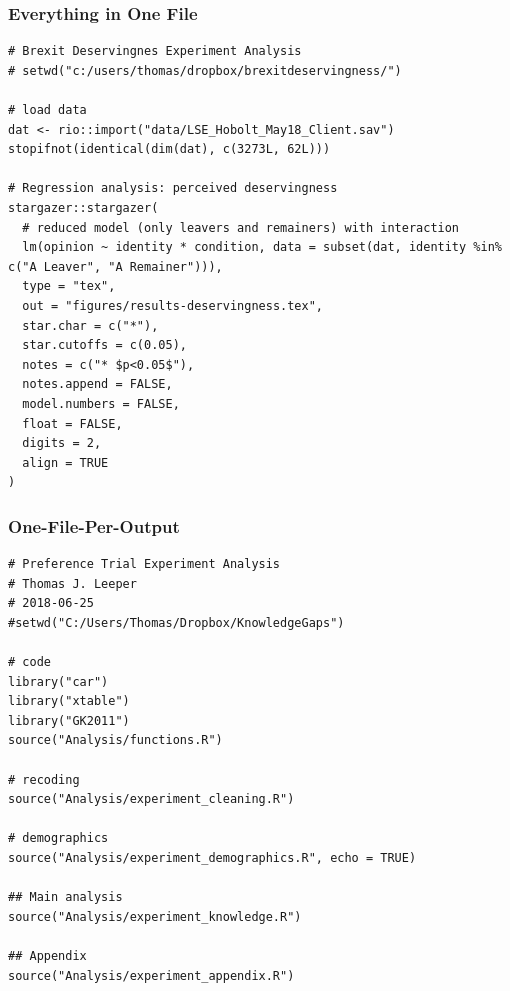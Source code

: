 \documentclass[14pt]{beamer}
\begin{document}




\begin{frame}[fragile]
\frametitle{Everything in One File}

\scriptsize

\begin{verbatim}
# Brexit Deservingnes Experiment Analysis
# setwd("c:/users/thomas/dropbox/brexitdeservingness/")

# load data
dat <- rio::import("data/LSE_Hobolt_May18_Client.sav")
stopifnot(identical(dim(dat), c(3273L, 62L)))

# Regression analysis: perceived deservingness
stargazer::stargazer(
  # reduced model (only leavers and remainers) with interaction
  lm(opinion ~ identity * condition, data = subset(dat, identity %in% c("A Leaver", "A Remainer"))),
  type = "tex",
  out = "figures/results-deservingness.tex",
  star.char = c("*"),
  star.cutoffs = c(0.05),
  notes = c("* $p<0.05$"),
  notes.append = FALSE,
  model.numbers = FALSE,
  float = FALSE,
  digits = 2,
  align = TRUE
)
\end{verbatim}
\end{frame}



\begin{frame}[fragile]
\frametitle{One-File-Per-Output}

\scriptsize

\begin{verbatim}
# Preference Trial Experiment Analysis
# Thomas J. Leeper
# 2018-06-25
#setwd("C:/Users/Thomas/Dropbox/KnowledgeGaps")

# code
library("car")
library("xtable")
library("GK2011")
source("Analysis/functions.R")

# recoding
source("Analysis/experiment_cleaning.R")

# demographics
source("Analysis/experiment_demographics.R", echo = TRUE)

## Main analysis
source("Analysis/experiment_knowledge.R")

## Appendix
source("Analysis/experiment_appendix.R")
\end{verbatim}
\end{frame}
\end{document}
